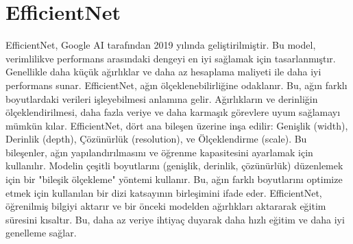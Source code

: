 \section{EfficientNet}
EfficientNet, Google AI tarafından 2019 yılında geliştirilmiştir. Bu model, verimlilikve performans arasındaki dengeyi en iyi sağlamak için tasarlanmıştır. Genellikle daha küçük ağırlıklar ve daha az hesaplama maliyeti ile daha iyi performans sunar. EfficientNet, ağın ölçeklenebilirliğine odaklanır. Bu, ağın farklı boyutlardaki verileri işleyebilmesi anlamına gelir. Ağırlıkların ve derinliğin ölçeklendirilmesi, daha fazla veriye ve daha karmaşık görevlere uyum sağlamayı mümkün kılar. EfficientNet, dört ana bileşen üzerine inşa edilir: Genişlik (width), Derinlik (depth), Çözünürlük (resolution), ve Ölçeklendirme (scale). Bu bileşenler, ağın yapılandırılmasını ve öğrenme kapasitesini ayarlamak için kullanılır. Modelin çeşitli boyutlarını (genişlik, derinlik, çözünürlük) düzenlemek için bir "bileşik ölçekleme" yöntemi kullanır. Bu, ağın farklı boyutlarını optimize etmek için kullanılan bir dizi katsayının birleşimini ifade eder. EfficientNet, öğrenilmiş bilgiyi aktarır ve bir önceki modelden ağırlıkları aktararak eğitim süresini kısaltır. Bu, daha az veriye ihtiyaç duyarak daha hızlı eğitim ve daha iyi genelleme sağlar.

\newpage